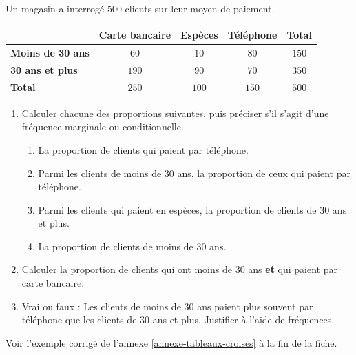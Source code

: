 \documentclass[10pt,a4paper]{article}
\begin{document}
\begin{bloc}
\begin{exo}
Un magasin a interrogé \(500\) clients sur leur moyen de paiement.

\begin{center}
\renewcommand{\arraystretch}{1.5}
\begin{tabular}{|l|c|c|c|c|}
    \hline
    & \textbf{Carte bancaire} & \textbf{Espèces} & \textbf{Téléphone} & \textbf{Total} \\
    \hline
    \textbf{Moins de 30 ans} & \(60\) & \(10\) & \(80\) & \(150\) \\
    \hline
    \textbf{30 ans et plus} & \(190\) & \(90\) & \(70\) & \(350\) \\
    \hline
    \textbf{Total} & \(250\) & \(100\) & \(150\) & \(500\) \\
    \hline
\end{tabular}
\end{center}

\begin{enumerate}[leftmargin=*]
    \item Calculer chacune des proportions suivantes, puis préciser s'il s'agit d'une fréquence marginale ou conditionnelle.
    \begin{enumerate}
        \item La proportion de clients qui paient par téléphone.
        \item Parmi les clients de moins de 30 ans, la proportion de ceux qui paient par téléphone.
        \item Parmi les clients qui paient en espèces, la proportion de clients de 30 ans et plus.
        \item La proportion de clients de moins de 30 ans.
    \end{enumerate}
    \item Calculer la proportion de clients qui ont moins de 30 ans \textbf{et} qui paient par carte bancaire.
    \item Vrai ou faux : \og Les clients de moins de 30 ans paient plus souvent par téléphone que les clients de 30 ans et plus. \fg{} Justifier à l'aide de fréquences.
\end{enumerate}
\end{exo}

\begin{indication}
    Voir l'exemple corrigé de l'annexe \ref{annexe-tableaux-croises} à la fin de la fiche.
\end{indication}
\end{bloc}
\end{document}
